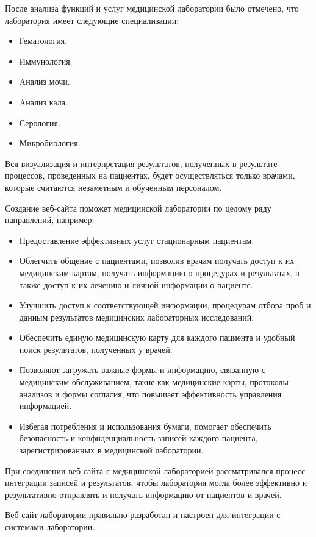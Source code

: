 После анализа функций и услуг медицинской лаборатории было отмечено, что лаборатория имеет следующие специализации:

\begin{itemize}
	\item Гематология.
	\item Иммунология.
	\item Aнализ мочи.
	\item Aнализ кала.
	\item Серология.
	\item Микробиология.
\end{itemize}

Вся визуализация и интерпретация результатов, полученных в результате процессов, проведенных на пациентах, будет осуществляться только врачами, которые считаются незаметным и обученным персоналом.

Создание веб-сайта поможет медицинской лаборатории по целому ряду направлений, например:
\begin{itemize}
	\item Предоставление эффективных услуг стационарным пациентам.
	\item Облегчить общение с пациентами, позволив врачам получать доступ к их медицинским картам, получать информацию о процедурах и результатах, а также доступ к их лечению и личной информации о пациенте.
	\item Улучшить доступ к соответствующей информации, процедурам отбора проб и данным результатов медицинских лабораторных исследований.
	\item Обеспечить единую медицинскую карту для каждого пациента и удобный поиск результатов, полученных у врачей.
	\item Позволяют загружать важные формы и информацию, связанную с медицинским обслуживанием, такие как медицинские карты, протоколы анализов и формы согласия, что повышает эффективность управления информацией.
	\item Избегая потребления и использования бумаги, помогает обеспечить безопасность и конфиденциальность записей каждого пациента, зарегистрированных в медицинской лаборатории.
\end{itemize}

При соединении веб-сайта с медицинской лабораторией рассматривался процесс интеграции записей и результатов, чтобы лаборатория могла более эффективно и результативно отправлять и получать информацию от пациентов и врачей.

Веб-сайт лаборатории правильно разработан и настроен для интеграции с системами лаборатории.

